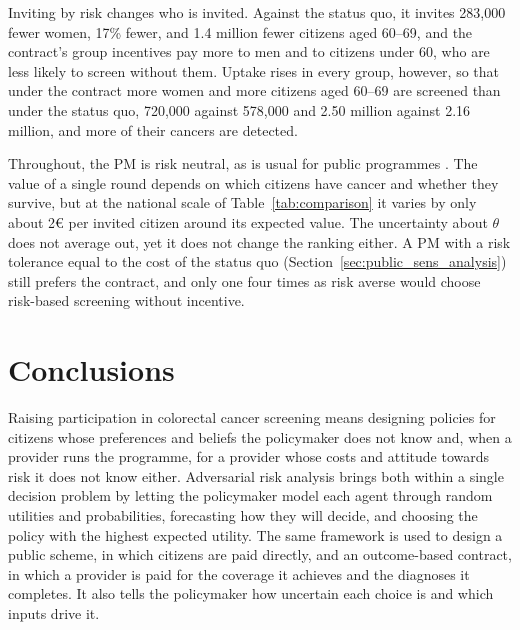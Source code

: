 \documentclass[12pt]{article}
\begin{document}
Inviting by risk changes who is invited. Against the status quo, it invites 283{,}000 fewer women, 17\% fewer, and 1.4 million fewer citizens aged 60--69, and the contract's group incentives pay more to men and to citizens under 60, who are less likely to screen without them. Uptake rises in every group, however, so that under the contract more women and more citizens aged 60--69 are screened than under the status quo, 720{,}000 against 578{,}000 and 2.50 million against 2.16 million, and more of their cancers are detected.

Throughout, the PM is risk neutral, as is usual for public programmes \citep{arrow1978uncertainty, baumstark2014relevance}. The value of a single round depends on which citizens have cancer and whether they survive, but at the national scale of Table~\ref{tab:comparison} it varies by only about 2€ per invited citizen around its expected value. The uncertainty about $\theta$ does not average out, yet it does not change the ranking either. A PM with a risk tolerance equal to the cost of the status quo (Section~\ref{sec:public_sens_analysis}) still prefers the contract, and only one four times as risk averse would choose risk-based screening without incentive.

\section{Conclusions} \label{sec:conclusions}
Raising participation in colorectal cancer screening means designing policies for citizens whose preferences and beliefs the policymaker does not know and, when a provider runs the programme, for a provider whose costs and attitude towards risk it does not know either. Adversarial risk analysis brings both within a single decision problem by letting the policymaker model each agent through random utilities and probabilities, forecasting how they will decide, and choosing the policy with the highest expected utility. The same framework is used to design a public scheme, in which citizens are paid directly, and an outcome-based contract, in which a provider is paid for the coverage it achieves and the diagnoses it completes. It also tells the policymaker how uncertain each choice is and which inputs drive it.
\end{document}
